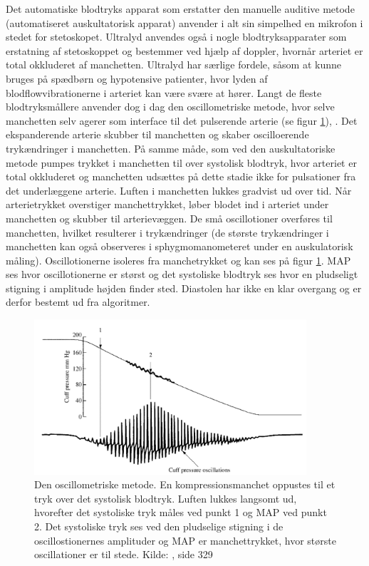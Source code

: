 Det automatiske blodtryks apparat som erstatter den manuelle auditive metode (automatiseret auskultatorisk apparat) anvender i alt sin simpelhed en mikrofon i stedet for stetoskopet. Ultralyd anvendes også i nogle blodtryksapparater som erstatning af stetoskoppet og bestemmer ved hjælp af doppler, hvornår arteriet er total okkluderet af manchetten. Ultralyd har særlige fordele, såsom at kunne bruges på spædbørn og hypotensive patienter, hvor lyden af blodflowvibrationerne i arteriet kan være svære at hører. Langt de fleste blodtryksmållere anvender dog i dag den oscillometriske metode, hvor selve manchetten selv agerer som interface til det pulserende arterie (se figur \ref{fig:OscillometriskMetode}), \cite{RefWorks:24} . Det ekspanderende arterie skubber til manchetten og skaber oscilloerende trykændringer i manchetten. På samme måde, som ved den auskultatoriske metode pumpes trykket i manchetten til over systolisk blodtryk, hvor arteriet er total okkluderet og manchetten udsættes på dette stadie ikke for pulsationer fra det underlæggene arterie. Luften i manchetten lukkes gradvist ud over tid. Når arterietrykket overstiger manchettrykket, løber blodet ind i arteriet under manchetten og skubber til arterievæggen. De små oscillotioner overføres til manchetten, hvilket resulterer i trykændringer (de største trykændringer i manchetten kan også observeres i sphygmomanometeret under en auskulatorisk måling). Oscillotionerne isoleres fra manchetrykket og kan ses på figur \ref{fig:OscillometriskMetode}. MAP ses hvor oscillotionerne er størst og det systoliske blodtryk ses hvor en pludseligt stigning i amplitude højden finder sted. Diastolen har ikke en klar overgang og er derfor bestemt ud fra algoritmer.

\begin{figure}[H]
	\centering
	\includegraphics[width=0.9\textwidth]{billeder/OscillometriskMetode.png}
	\caption{Den oscillometriske metode. En kompressionsmanchet oppustes til et tryk over det systolisk blodtryk. Luften lukkes langsomt ud, hvorefter det systoliske tryk måles ved punkt 1 og MAP ved punkt 2. Det systoliske tryk ses ved den pludselige stigning i de oscillostionernes amplituder og MAP er manchettrykket, hvor største oscillationer er til stede. Kilde: \cite{RefWorks:27}, side 329} \label{fig:OscillometriskMetode}
\end{figure}

